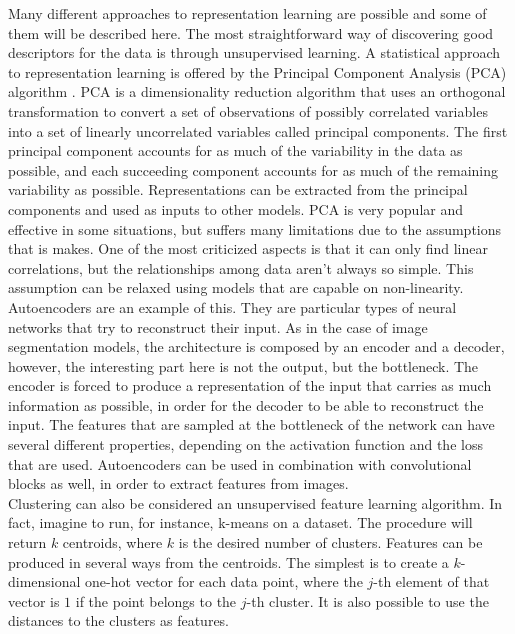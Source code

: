 Many different approaches to representation learning are possible and some of them will be described here. The most straightforward way of discovering good descriptors for the data is through unsupervised learning. A statistical approach to representation learning is offered by the Principal Component Analysis (PCA) algorithm \cite{jolliffe2011principal}. PCA is a dimensionality reduction algorithm that uses an orthogonal transformation to convert a set of observations of possibly correlated variables into a set of linearly uncorrelated variables called principal components. The first principal component accounts for as much of the variability in the data as possible, and each succeeding component accounts for as much of the remaining variability as possible. Representations can be extracted from the principal components and used as inputs to other models. PCA is very popular and effective in some situations, but suffers many limitations due to the assumptions that is makes. One of the most criticized aspects is that it can only find linear correlations, but the relationships among data aren't always so simple. This assumption can be relaxed using models that are capable on non-linearity. Autoencoders are an example of this. They are particular types of neural networks that try to reconstruct their input. As in the case of image segmentation models, the architecture is composed by an encoder and a decoder, however, the interesting part here is not the output, but the bottleneck. The encoder is forced to produce a representation of the input that carries as much information as possible, in order for the decoder to be able to reconstruct the input. The features that are sampled at the bottleneck of the network can have several different properties, depending on the activation function and the loss that are used. Autoencoders can be used in combination with convolutional blocks as well, in order to extract features from images.\\
Clustering can also be considered an unsupervised feature learning algorithm. In fact, imagine to run, for instance, k-means on a dataset. The procedure will return $k$ centroids, where $k$ is the desired number of clusters. Features can be produced in several ways from the centroids. The simplest is to create a $k$-dimensional one-hot vector for each data point, where the $j$-th element of that vector is $1$ if the point belongs to the $j$-th cluster. It is also possible to use the distances to the clusters as features.\\
